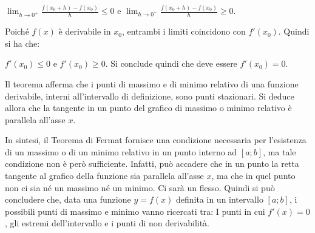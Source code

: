 \documentclass[a4paper,11pt]{article}
\begin{document}
\vspace{1mm}

$\lim_{h \to 0^+} \frac{f(x_0 + h)-f(x_0)}{h} \leqslant 0$ \hspace{3mm} e \hspace{3mm}
$\lim_{h \to 0^-} \frac{f(x_0 + h)-f(x_0)}{h} \geqslant 0$.

\vspace{1mm}

Poiché $f(x)$ è derivabile in $x_0$, entrambi i limiti coincidono con $f'(x_0)$. Quindi si ha che:

$f'(x_0) \leqslant 0$ \hspace{3mm} e \hspace{3mm}
$f'(x_0) \geqslant 0$.
\hspace{3mm}
Si conclude quindi che deve essere $f'(x_0)=0$.

\vspace{2mm}

Il teorema afferma che i punti di massimo e di minimo relativo di una funzione derivabile, interni all'intervallo di definizione, sono punti stazionari. Si deduce allora che la tangente in un punto del grafico di massimo o minimo relativo è parallela all'asse $x$.

\vspace{2mm}

In sintesi, il Teorema di Fermat fornisce una condizione necessaria per l'esistenza di un massimo o di un minimo relativo in un punto interno ad $[a;b]$, ma tale condizione non è però sufficiente. Infatti, può accadere che in un punto la retta tangente al grafico della funzione sia parallela all'asse $x$, ma che in quel punto non ci sia né un massimo né un minimo. Ci sarà un flesso. Quindi si può concludere che, data una funzione $y=f(x)$ definita in un intervallo $[a;b]$, i possibili punti di massimo e minimo vanno ricercati tra: I punti in cui $f'(x)=0$, gli estremi dell'intervallo e i punti di non derivabilità.
\end{document}
